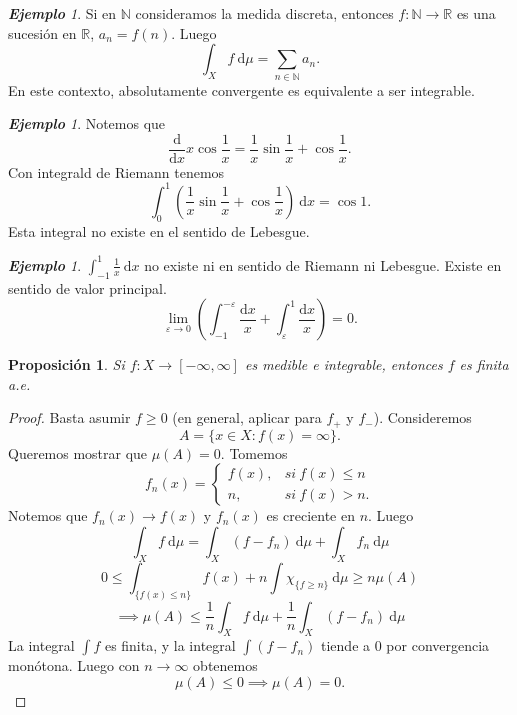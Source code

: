 \documentclass{article}
\newtheorem{proposition}[theorem]{Proposición}
\theoremstyle{definition}
\theoremstyle{remark}
\newtheorem{example}[theorem]{\textbf{Ejemplo}}
\numberwithin{equation}{section}
\newcommand{\N}{\mathbb{N}}
\newcommand{\R}{\mathbb{R}}
\newcommand{\e}{\varepsilon}
\newcommand{\oo}{\infty}
\newcommand{\br}[1]{\left( #1 \right)}
\newcommand{\rac}[2]{\frac{#1}{#2}}
\newcommand{\ds}{\displaystyle}
\begin{document}
\begin{example}
  Si en $\N$ consideramos la medida discreta, entonces $f \colon \N \to \R$ es una sucesión en $\R$, $a_n = f(n)$. Luego 
  \[ \int_X f \ \mathrm{d}\mu = \sum_{n\in\N} a_n. \]
  En este contexto, absolutamente convergente es equivalente a ser integrable.
\end{example}

\begin{example}
  Notemos que 
  \[ \frac{\mathrm{d}}{\mathrm{d}x} x \cos \frac1x = \frac1x \sin\frac1x + \cos\frac1x. \]
  Con integrald de Riemann tenemos 
  \[ \int_0^1 \br{\rac1x \sin\frac1x + \cos\frac1x} \ \mathrm{d}x = \cos1. \]
  Esta integral no existe en el sentido de Lebesgue.
\end{example}

\begin{example}
  $\ds \int_{-1}^1 \frac1x \ \mathrm{d}x$ no existe ni en sentido de Riemann ni Lebesgue. Existe en sentido de valor principal. 
  \[ \lim_{\e \to 0} \br{\int_{-1}^{-\e} \frac{\mathrm{d}x}{x} + \int_\e^1 \frac{\mathrm{d}x}{x}} = 0. \]
\end{example}

\begin{proposition}
  Si $f \colon X \to [-\oo,\oo]$ es medible e integrable, entonces $f$ es finita a.e.
\end{proposition}
\begin{proof}
  Basta asumir $f \geq 0$ (en general, aplicar para $f_+$ y $f_-$). Consideremos 
  \[ A = \{x \in X \colon f(x) = \oo\}. \]
  Queremos mostrar que $\mu(A) = 0$. Tomemos 
  \[ f_n(x) = \begin{cases}
    f(x), &si \ f(x) \leq n \\
    n, &si \ f(x) > n.
  \end{cases} \]
  Notemos que $f_n(x) \to f(x)$ y $f_n(x)$ es creciente en $n$. Luego
  \[ \int_X f \ \mathrm{d}\mu= \int_X (f - f_n) \ \mathrm{d}\mu + \int_X f_n \ \mathrm{d}\mu \]
  \[ 0 \leq \int_{\{f(x) \leq n\}} f(x) + n \int \chi_{\{f \geq n\}} \ \mathrm{d}\mu \geq n \mu(A) \]
  \[ \implies \mu(A) \leq \frac1n \int_X f \ \mathrm{d}\mu + \frac1n \int_X (f - f_n) \ \mathrm{d}\mu \]
  La integral $\int f$ es finita, y la integral $\int (f-f_n)$ tiende a 0 por convergencia monótona. Luego con $n \to \oo$ obtenemos 
  \[ \mu(A) \leq 0 \implies \mu(A) = 0. \]
\end{proof}
\end{document}
